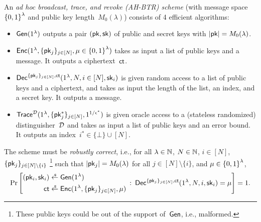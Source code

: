 \begin{definition}[AH-BTR]\label{def:ahbtr}
An \emph{ad hoc broadcast, trace, and revoke (AH-BTR) scheme}
(with message space~${\{0,1\}}^\lambda$ and public key length~$M_0(\lambda)$)
consists of 4 efficient algorithms:
\begin{itemize}
\item $\Gen(1^\lambda)$ outputs a pair $(\pk,\sk)$ of public and secret keys
with ${|\pk|=M_0(\lambda)}$.
\item $\Enc(1^\lambda,\{\pk_j\}_{j\in[N]},{\mu\in\bit^\lambda})$
takes as input
a list of public keys and a message.
It outputs a ciphertext~$\ct$.
\item $\Dec^{\{\pk_j\}_{j\in[N]},\ct}(1^\lambda,N,i\in[N],\sk_i)$
is given random access to a list of public keys and a ciphertext, and
takes as input
the length of the list,
an index, and
a secret key.
It outputs a message.
\item $\Trace^\scriptD(1^\lambda,\{\pk^\ast_j\}_{j\in[N]},1^{1/\epsilon^\ast})$
is given oracle access to a (stateless randomized) distinguisher~${\mathcal{D}}$ and takes as input
a list of public keys and an error bound.
It outputs an index~${i^\ast\in\{\bot\}\cup[N]}$.
\end{itemize}
The scheme must be \emph{robustly correct}, i.e., for all
${\lambda\in{\mathbb{N}}}$,
${N\in{\mathbb{N}}}$,
${i\in[N]}$,\WideNarrow{}{\linebreak[4]}
$\{\pk_j\}_{j\in[N]\setminus\{i\}}$%
\footnote{These public keys could be out of the support of~$\Gen$,
i.e., malformed.}
such that ${|\pk_j|=M_0(\lambda)}$ for all ${j\in[N]\setminus\{i\}}$, and
${\mu\in{\{0,1\}}^\lambda}$,
\begin{align*}
\Pr\left[
\begin{aligned}
(\pk_i,\sk_i)&{}\draws\Gen(1^\lambda)\\
\ct&{}\draws\Enc(1^\lambda,\{\pk_j\}_{j\in[N]},\mu)
\end{aligned}
\::\:
\Dec^{\{\pk_j\}_{j\in[N]},\ct}(1^\lambda,N,i,\sk_i)=\mu
\right]=1.
\end{align*}
\end{definition}
